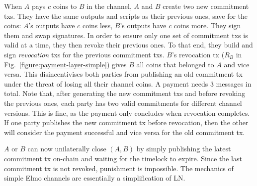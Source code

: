   When $A$ pays $c$ coins to $B$ in the channel, $A$ and $B$ create two new
  commitment txs.
  They have the same outputs and scripts as their previous ones, save for the
  coins: $A$'s outputs have $c$ coins less, $B$'s outputs have $c$ coins more.
  They sign them and swap signatures. In order to ensure only one set of
  commitment txs is valid at a time, they then revoke their previous ones. To
  that end, they build and sign \emph{revocation} txs for the previous
  commitment txs. $B$'s revocation tx ($R_B$ in
  Fig.~\ref{figure:payment-layer-simple}) gives $B$ all coins that belonged
  to $A$ and vice versa. This disincentivises both parties
  from publishing an old commitment tx under the threat of
  losing all their channel coins. A payment needs $3$ messages in total. Note
  that, after generating the new commitment txs and before revoking the previous
  ones, each party has two valid commitments for different channel versions.
  This is fine, as the payment only concludes when revocation completes. If one
  party publishes the new commitment tx before revocation, then the
  other will consider the payment successful and vice versa for the old
  commitment tx.

  $A$ or $B$ can now unilaterally close $(A, B)$ by simply publishing the latest
  commitment tx on-chain and waiting for the timelock to expire. Since the last
  commitment tx is not revoked, punishment is impossible. The
  mechanics of simple Elmo channels are essentially a simplification of LN.

